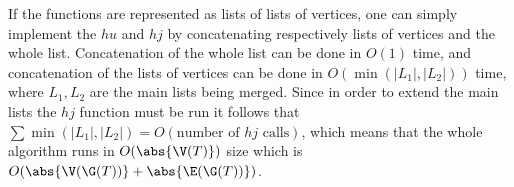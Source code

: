 If the functions are represented as lists of lists of vertices, one can simply implement the $hu$ and $hj$ by concatenating respectively lists of vertices and the whole list. Concatenation of the whole list can be done in $O(1)$ time, and concatenation of the lists of vertices can be done in $O(\min(|L_1|, |L_2|))$ time, where $L_1, L_2$ are the main lists being merged. Since in order to extend the main lists the $hj$ function must be run it follows that $\sum \min(|L_1|, |L_2|) = O(\text{number of $hj$ calls})$, which means that the whole algorithm runs in $O(\abs{\V(T)})$ size which is $O(\abs{\V(\G(T))} + \abs{\E(\G(T))})$.